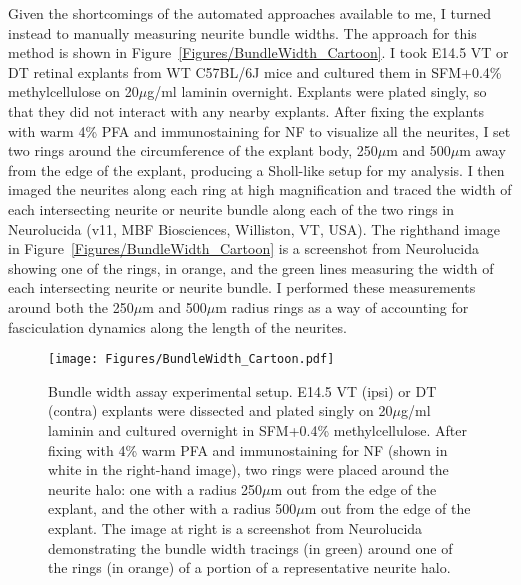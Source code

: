 Given the shortcomings of the automated approaches available to me, I turned instead to manually measuring neurite bundle widths.
The approach for this method is shown in Figure~\ref{Figures/BundleWidth_Cartoon}.
I took E14.5 VT or DT retinal explants from WT C57BL/6J mice and cultured them in SFM+0.4\% methylcellulose on 20$\mu$g/ml laminin overnight.
Explants were plated singly, so that they did not interact with any nearby explants.
After fixing the explants with warm 4\% PFA and immunostaining for NF to visualize all the neurites, I set two rings around the circumference of the explant body, 250$\mu$m and 500$\mu$m away from the edge of the explant, producing a Sholl-like setup for my analysis.
I then imaged the neurites along each ring at high magnification and traced the width of each intersecting neurite or neurite bundle along each of the two rings in Neurolucida (v11, MBF Biosciences, Williston, VT, USA).
The righthand image in Figure~\ref{Figures/BundleWidth_Cartoon} is a screenshot from Neurolucida showing one of the rings, in orange, and the green lines measuring the width of each intersecting neurite or neurite bundle.
I performed these measurements around both the 250$\mu$m and 500$\mu$m radius rings as a way of accounting for fasciculation dynamics along the length of the neurites.
\begin{figure}[hbtp]
    \begin{center}
        \texttt{[image: Figures/BundleWidth\_Cartoon.pdf]}
        \caption[Bundle width assay experimental setup.]
        {Bundle width assay experimental setup.
        E14.5 VT (ipsi) or DT (contra) explants were dissected and plated singly on 20$\mu$g/ml laminin and cultured overnight in SFM+0.4\% methylcellulose.
        After fixing with 4\% warm PFA and immunostaining for NF (shown in white in the right-hand image), two rings were placed around the neurite halo: one with a radius 250$\mu$m out from the edge of the explant, and the other with a radius 500$\mu$m out from the edge of the explant.
        The image at right is a screenshot from Neurolucida demonstrating the bundle width tracings (in green) around one of the rings (in orange) of a portion of a representative neurite halo.
        }
        \label{Figures/BundleWidthCartoon}
    \end{center}
\end{figure}

